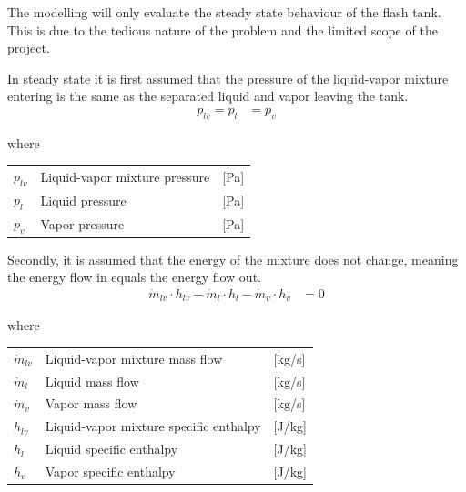 The modelling will only evaluate the steady state behaviour of the flash tank. This is due to the tedious nature of the problem and the limited scope of the project. 

In steady state it is first assumed that the pressure of the liquid-vapor mixture entering is the same as the separated liquid and vapor leaving the tank. 
\begin{align}
	p_{lv} 	= p_{l}					&  = p_{v} 
	\label{eq:Flash_tank_pressure}
\end{align}

where 

\begin{center}
	\begin{tabular}{l p{8cm} l}
		$p_{lv}$				&  Liquid-vapor mixture pressure		& [\si{Pa}]\\
		$p_{l}$					&  Liquid pressure 						& [\si{Pa}] \\
		$p_{v}$					&  Vapor pressure						& [\si{Pa}]\\
		
	\end{tabular}
\end{center}


Secondly, it is assumed that the energy of the mixture does not change, meaning the energy flow in equals the energy flow out. 
\begin{align}
	\dot{m}_{lv} \cdot  h_{lv}  - \dot{m}_{l} \cdot  h_{l} - \dot{m}_{v} \cdot  h_{v} & = 0
	\label{eq:Flash_tank_energyflow} 
\end{align}

where 

\begin{center}
	\begin{tabular}{l p{8cm} l}
		$\dot{m}_{lv}$			&  Liquid-vapor mixture mass flow			& [\si{kg}/\si{s}]\\
		$\dot{m}_{l}$			&  Liquid mass flow 						& [\si{kg}/\si{s}] \\
		$\dot{m}_{v}$			&  Vapor mass flow							& [\si{kg}/\si{s}]\\
		$h_{lv}$				&  Liquid-vapor mixture specific enthalpy	& [\si{J}/\si{kg}]\\
		$h_{l}$					&  Liquid specific enthalpy 				& [\si{J}/\si{kg}] \\
		$h_{v}$					&  Vapor specific enthalpy					& [\si{J}/\si{kg}]\\
		
	\end{tabular}
\end{center}


